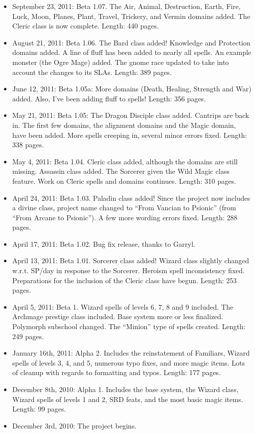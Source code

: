 \begin{itemize}
 \item September 23, 2011: Beta 1.07. The Air, Animal, Destruction, Earth, Fire, Luck, Moon, Planes, Plant, Travel, Trickery, and Vermin domains added. The Cleric class is now complete. Length: 440 pages.
 \item August 21, 2011: Beta 1.06. The Bard class added! Knowledge and Protection domains added. A line of fluff has been added to nearly all spells. An example monster (the Ogre Mage) added. The gnome race updated to take into account the changes to its SLAs. Length: 389 pages.
 \item June 12, 2011: Beta 1.05a: More domains (Death, Healing, Strength and War) added.
 Also, I've been adding fluff to spells! Length: 356 pages.
 \item May 21, 2011: Beta 1.05: The Dragon Disciple class added. Cantrips are back in. The first few domains, the alignment domains and the Magic domain, have been added.
 More spells creeping in, several minor errors fixed. Length: 338 pages.
 \item May 4, 2011: Beta 1.04. Cleric class added, although the domains are still missing.
 Assassin class added. The Sorcerer given the Wild Magic class feature. Work on Cleric spells and domains continues.
 Length: 310 pages.
 \item April 24, 2011: Beta 1.03. Paladin class added! Since the project now includes a divine class, project name changed to ``From Vancian to Psionic''
 (from ``From Arcane to Psionic''). A few more wording errors fixed. Length: 288 pages.
 \item April 17, 2011: Beta 1.02. Bug fix release, thanks to Garryl.
 \item April 13, 2011: Beta 1.01. Sorcerer class added! Wizard class slightly changed w.r.t. SP/day in response to the Sorcerer. Heroism spell inconsistency fixed.
 Preparations for the inclusion of the Cleric class have begun.
 Length: 253 pages.
 \item April 5, 2011: Beta 1. Wizard spells of levels 6, 7, 8 and 9 included. The Archmage prestige class included.
 Base system more or less finalized. Polymorph subschool changed. The ``Minion'' type of spells created.
 Length: 249 pages.
 \item January 16th, 2011: Alpha 2. Includes the reinstatement of Familiars, Wizard spells of levels 3, 4, and 5, numerous typo fixes, and more magic items.
 Lots of cleanup with regards to formatting and typos. Length: 177 pages.
 \item December 8th, 2010: Alpha 1. Includes the base system, the Wizard class, Wizard spells of levels 1 and 2, SRD feats,
 and the most basic magic items. Length: 99 pages.
 \item December 3rd, 2010: The project begins.
\end{itemize}
